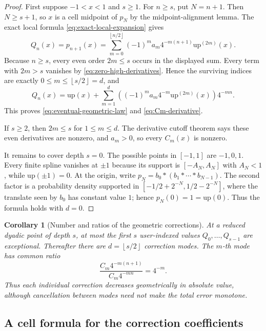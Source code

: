 \documentclass[11pt,oneside]{article}
\numberwithin{equation}{section}
\newtheorem{corollary}[theorem]{Corollary}
\theoremstyle{definition}
\theoremstyle{remark}
\newcommand{\upf}{\mathrm{up}}
\newcommand{\floor}[1]{\left\lfloor #1\right\rfloor}
\begin{document}
\begin{proof}
First suppose $-1<x<1$ and $s\ge1$.  For $n\ge s$, put $N=n+1$.  Then
$N\ge s+1$, so $x$ is a cell midpoint of $p_N$ by the midpoint-alignment lemma.
The exact local formula \eqref{eq:exact-local-expansion} gives
\[
 Q_n(x)=p_{n+1}(x)
 =\sum_{m=0}^{\floor{n/2}}(-1)^ma_m4^{-m(n+1)}\upf^{(2m)}(x).
\]
Because $n\ge s$, every even order $2m\le s$ occurs in the displayed sum.
Every term with $2m>s$ vanishes by
\eqref{eq:zero-high-derivatives}.  Hence the surviving indices are exactly
$0\le m\le\floor{s/2}=d$, and
\[
 Q_n(x)=\upf(x)+\sum_{m=1}^{d}
 \left((-1)^ma_m4^{-m}\upf^{(2m)}(x)\right)4^{-mn}.
\]
This proves \eqref{eq:eventual-geometric-law} and
\eqref{eq:Cm-derivative}.

If $s\ge2$, then $2m\le s$ for $1\le m\le d$.  The derivative cutoff theorem
says these even derivatives are nonzero, and $a_m>0$, so every $C_m(x)$ is
nonzero.

It remains to cover depth $s=0$.  The possible points in $[-1,1]$ are
$-1,0,1$.  Every finite spline vanishes at $\pm1$ because its support is
$[-A_N,A_N]$ with $A_N<1$, while $\upf(\pm1)=0$.  At the origin, write
$p_N=b_0*(b_1*\cdots*b_{N-1})$.  The second factor is a probability density
supported in $[-1/2+2^{-N},1/2-2^{-N}]$, where the translate seen by $b_0$ has
constant value $1$; hence $p_N(0)=1=\upf(0)$.  Thus the formula holds with
$d=0$.
\end{proof}

\begin{corollary}[Number and ratios of the geometric corrections]
At a reduced dyadic point of depth $s$, at most the first $s$ user-indexed values
$Q_0,\ldots,Q_{s-1}$ are exceptional.  Thereafter there are
$d=\floor{s/2}$ correction modes.  The $m$-th mode has common ratio
\begin{equation}
 \frac{C_m4^{-m(n+1)}}{C_m4^{-mn}}=4^{-m}.
 \label{eq:mode-ratio}
\end{equation}
Thus each individual correction decreases geometrically in absolute value,
although cancellation between modes need not make the total error monotone.
\end{corollary}

\subsection{A cell formula for the correction coefficients}
\end{document}
